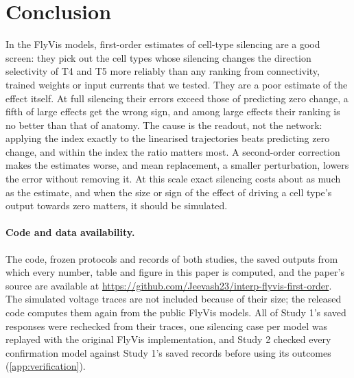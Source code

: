 \section{Conclusion}
\label{sec:conclusion}

In the \NModels{} FlyVis models, first-order estimates of cell-type silencing are a good screen: they pick out the cell types whose silencing changes the direction selectivity of T4 and T5 more reliably than any ranking from connectivity, trained weights or input currents that we tested. They are a poor estimate of the effect itself. At full silencing their errors exceed those of predicting zero change, a fifth of large effects get the wrong sign, and among large effects their ranking is no better than that of anatomy. The cause is the readout, not the network: applying the index exactly to the linearised trajectories beats predicting zero change, and within the index the ratio matters most. A second-order correction makes the estimates worse, and mean replacement, a smaller perturbation, lowers the error without removing it. At this scale exact silencing costs about as much as the estimate, and when the size or sign of the effect of driving a cell type's output towards zero matters, it should be simulated.

\paragraph{Code and data availability.}
\enlargethispage{\baselineskip}The code, frozen protocols and records of both studies, the saved outputs from which every number, table and figure in this paper is computed, and the paper's source are available at \url{https://github.com/Jeevash23/interp-flyvis-first-order}. The simulated voltage traces are not included because of their size; the released code computes them again from the public FlyVis models. All of Study 1's saved responses were rechecked from their traces, one silencing case per model was replayed with the original FlyVis implementation, and Study 2 checked every confirmation model against Study 1's saved records before using its outcomes (\cref{app:verification}).
